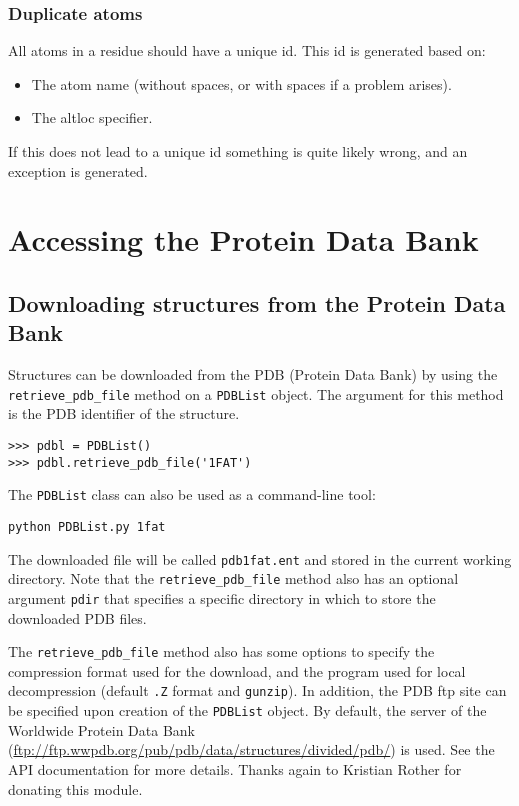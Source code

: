 \subsubsection{Duplicate atoms}

All atoms in a residue should have a unique id. This id is generated based on:

\begin{itemize}
\item The atom name (without spaces, or with spaces if a problem arises).
\item The altloc specifier.
\end{itemize}
If this does not lead to a unique id something is quite likely wrong, and an
exception is generated.

\section{Accessing the Protein Data Bank}

\subsection{Downloading structures from the Protein Data Bank}

Structures can be downloaded from the PDB (Protein Data Bank)
by using the \texttt{retrieve\_pdb\_file} method on a \texttt{PDBList} object.
The argument for this method is the PDB identifier of the structure.

\begin{verbatim}
>>> pdbl = PDBList()
>>> pdbl.retrieve_pdb_file('1FAT')
\end{verbatim}

The \texttt{PDBList} class can also be used as a command-line tool:
\begin{verbatim}
python PDBList.py 1fat
\end{verbatim}
The downloaded file will be called \texttt{pdb1fat.ent} and stored
in the current working directory. Note that the \texttt{retrieve\_pdb\_file}
method also has an optional argument \texttt{pdir} that specifies
a specific directory in which to store the downloaded PDB files.

The \texttt{retrieve\_pdb\_file} method also has some options to specify
the compression format used for the download, and the program used
for local decompression (default \texttt{.Z} format and \texttt{gunzip}).
In addition, the PDB ftp site can be specified upon creation of the
\texttt{PDBList} object. By default, the server of the Worldwide Protein Data Bank (\url{ftp://ftp.wwpdb.org/pub/pdb/data/structures/divided/pdb/})
is used. See the API documentation for more details. Thanks again
to Kristian Rother for donating this module.

